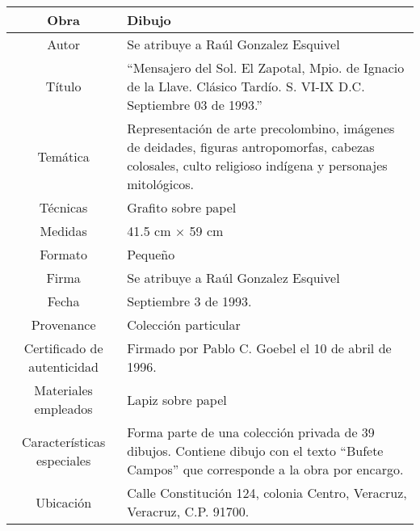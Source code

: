 \begin{table}[H]
\centering
\begin{tabular}{|c|m{}|}
\hline
Obra& Dibujo	\\
\hline
Autor & Se atribuye a Ra\'ul Gonzalez Esquivel\\
\hline
T\'itulo & ``Mensajero del Sol. El Zapotal, Mpio. de Ignacio de la Llave. Cl\'asico Tard\'io. S. VI-IX D.C. Septiembre 03 de 1993.''\\
\hline
Tem\'atica & Representaci\'on de arte precolombino, im\'agenes de deidades, figuras antropomorfas, cabezas colosales, culto religioso ind\'igena y personajes mitol\'ogicos.\\
\hline
T\'ecnicas &Grafito sobre papel \\
\hline
Medidas & 41.5 cm $\times$ 59 cm \\
\hline
 Formato & Peque\~no \\
 \hline
 Firma & Se atribuye a Ra\'ul Gonzalez Esquivel \\
 \hline
  Fecha & Septiembre 3 de 1993.\\
 \hline
 Provenance & Colecci\'on particular\\
 \hline
 Certificado de autenticidad& Firmado por Pablo C. Goebel el 10 de abril de 1996.  \\
 \hline 
  Materiales empleados & Lapiz sobre papel\\
 \hline
 Caracter\'isticas especiales & Forma parte de una colecci\'on privada de 39 dibujos. 
Contiene dibujo con el texto ``Bufete Campos'' que corresponde a la obra por encargo. \\
\hline 
Ubicaci\'on & Calle Constituci\'on 124, colonia Centro, Veracruz, Veracruz, C.P. 91700.\\
\hline

\end{tabular}
\end{table}

